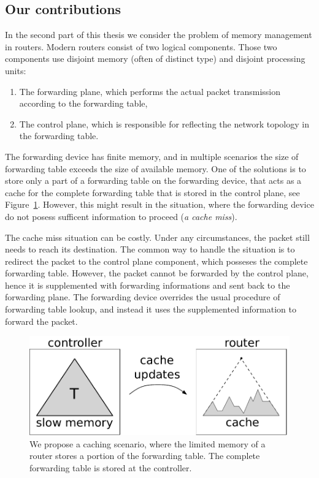 \subsection{Our contributions}

In the second part of this thesis we consider the problem of memory management in routers.
Modern routers consist of two logical components. Those two components use disjoint memory (often of distinct type) and disjoint processing units:
\begin{enumerate}
  \item The forwarding plane, which performs the actual packet transmission according to the forwarding table,
  \item The control plane, which is responsible for reflecting the network topology in the forwarding table.
\end{enumerate}

The forwarding device has finite memory, and in multiple scenarios the size of forwarding table exceeds the size of available memory.
One of the solutions is to store only a part of a forwarding table on the forwarding device, that acts as a cache for the complete forwarding table that is stored in the control plane, see Figure~\ref{fig:router}.
However, this might result in the situation, where the forwarding device do not posess sufficent information to proceed (\emph{a cache miss}).

The cache miss situation can be costly.
Under any circumstances, the packet still needs to reach its destination.
The common way to handle the situation is to redirect the packet to the control plane component, which posseses the complete forwarding table.
However, the packet cannot be forwarded by the control plane, hence it is supplemented with forwarding informations and sent back to the forwarding plane.
The forwarding device overrides the usual procedure of forwarding table lookup, and instead it uses the supplemented information to forward the packet.


\begin{figure}[t]
\centering
\includegraphics[width=0.39\columnwidth]{figs/router2.pdf}
\caption{We propose a caching scenario, where the limited memory of a router stores a portion of the forwarding table. The complete forwarding table is stored at the controller.}\label{fig:router}
\vspace{-1em}
\end{figure}




